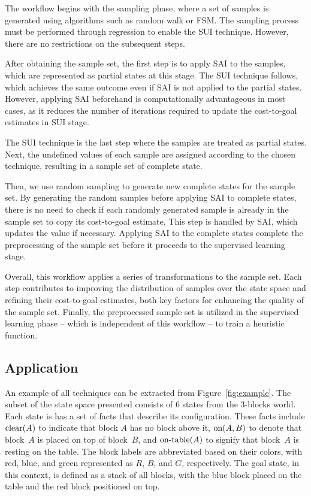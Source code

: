 The workflow begins with the sampling phase, where a set of samples is generated using algorithms such as random walk or FSM. The sampling process must be performed through regression to enable the SUI technique. However, there are no restrictions on the subsequent steps. 

After obtaining the sample set, the first step is to apply SAI to the samples, which are represented as partial states at this stage. The SUI technique follows, which achieves the same outcome even if SAI is not applied to the partial states. However, applying SAI beforehand is computationally advantageous in most cases, as it reduces the number of iterations required to update the cost-to-goal estimates in SUI stage.

The SUI technique is the last step where the samples are treated as partial states. Next, the undefined values of each sample are assigned according to the chosen technique, resulting in a sample set of complete state.

Then, we use random sampling to generate new complete states for the sample set. By generating the random samples before applying SAI to complete states, there is no need to check if each randomly generated sample is already in the sample set to copy its cost-to-goal estimate. This step is handled by SAI, which updates the value if necessary. Applying SAI to the complete states complete the preprocessing of the sample set before it proceeds to the supervised learning stage.

Overall, this workflow applies a series of transformations to the sample set. Each step contributes to improving the distribution of samples over the state space and refining their cost-to-goal estimates, both key factors for enhancing the quality of the sample set. Finally, the preprocessed sample set is utilized in the supervised learning phase -- which is independent of this workflow -- to train a heuristic function.

\subsection{Application}
\label{sec:example}

An example of all techniques can be extracted from Figure~\ref{fig:example}. The subset of the state space presented consists of $6$ states from the $3$-blocks world. Each state is has a set of facts that describe its configuration. These facts include $\text{clear}(A)$ to indicate that block $A$ has no block above it, $\text{on}(A,B)$ to denote that block~$A$ is placed on top of block~$B$, and $\text{on-table}(A)$ to signify that block~$A$ is resting on the table. The block labels are abbreviated based on their colors, with red, blue, and green represented as $R$, $B$, and $G$, respectively. The goal state, in this context, is defined as a stack of all blocks, with the blue block placed on the table and the red block positioned on top.

